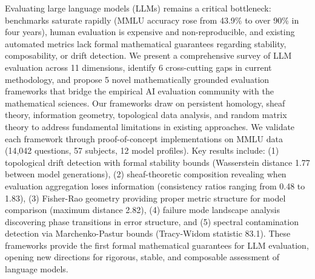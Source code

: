 Evaluating large language models (LLMs) remains a critical bottleneck: benchmarks saturate rapidly (MMLU accuracy rose from 43.9\% to over 90\% in four years), human evaluation is expensive and non-reproducible, and existing automated metrics lack formal mathematical guarantees regarding stability, composability, or drift detection.
We present a comprehensive survey of LLM evaluation across 11 dimensions, identify 6 cross-cutting gaps in current methodology, and propose 5 novel mathematically grounded evaluation frameworks that bridge the empirical AI evaluation community with the mathematical sciences.
Our frameworks draw on persistent homology, sheaf theory, information geometry, topological data analysis, and random matrix theory to address fundamental limitations in existing approaches.
We validate each framework through proof-of-concept implementations on MMLU data (14,042 questions, 57 subjects, 12 model profiles).
Key results include: (1) topological drift detection with formal stability bounds (Wasserstein distance 1.77 between model generations), (2) sheaf-theoretic composition revealing when evaluation aggregation loses information (consistency ratios ranging from 0.48 to 1.83), (3) Fisher-Rao geometry providing proper metric structure for model comparison (maximum distance 2.82), (4) failure mode landscape analysis discovering phase transitions in error structure, and (5) spectral contamination detection via Marchenko-Pastur bounds (Tracy-Widom statistic 83.1).
These frameworks provide the first formal mathematical guarantees for LLM evaluation, opening new directions for rigorous, stable, and composable assessment of language models.
